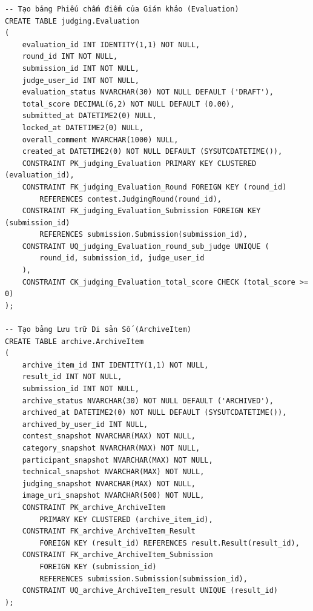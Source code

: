 \begin{verbatim}
-- Tạo bảng Phiếu chấm điểm của Giám khảo (Evaluation)
CREATE TABLE judging.Evaluation
(
    evaluation_id INT IDENTITY(1,1) NOT NULL,
    round_id INT NOT NULL,
    submission_id INT NOT NULL,
    judge_user_id INT NOT NULL,
    evaluation_status NVARCHAR(30) NOT NULL DEFAULT ('DRAFT'),
    total_score DECIMAL(6,2) NOT NULL DEFAULT (0.00),
    submitted_at DATETIME2(0) NULL,
    locked_at DATETIME2(0) NULL,
    overall_comment NVARCHAR(1000) NULL,
    created_at DATETIME2(0) NOT NULL DEFAULT (SYSUTCDATETIME()),
    CONSTRAINT PK_judging_Evaluation PRIMARY KEY CLUSTERED (evaluation_id),
    CONSTRAINT FK_judging_Evaluation_Round FOREIGN KEY (round_id) 
        REFERENCES contest.JudgingRound(round_id),
    CONSTRAINT FK_judging_Evaluation_Submission FOREIGN KEY (submission_id) 
        REFERENCES submission.Submission(submission_id),
    CONSTRAINT UQ_judging_Evaluation_round_sub_judge UNIQUE (
        round_id, submission_id, judge_user_id
    ),
    CONSTRAINT CK_judging_Evaluation_total_score CHECK (total_score >= 0)
);

-- Tạo bảng Lưu trữ Di sản Số (ArchiveItem)
CREATE TABLE archive.ArchiveItem
(
    archive_item_id INT IDENTITY(1,1) NOT NULL,
    result_id INT NOT NULL,
    submission_id INT NOT NULL,
    archive_status NVARCHAR(30) NOT NULL DEFAULT ('ARCHIVED'),
    archived_at DATETIME2(0) NOT NULL DEFAULT (SYSUTCDATETIME()),
    archived_by_user_id INT NULL,
    contest_snapshot NVARCHAR(MAX) NOT NULL,
    category_snapshot NVARCHAR(MAX) NOT NULL,
    participant_snapshot NVARCHAR(MAX) NOT NULL,
    technical_snapshot NVARCHAR(MAX) NOT NULL,
    judging_snapshot NVARCHAR(MAX) NOT NULL,
    image_uri_snapshot NVARCHAR(500) NOT NULL,
    CONSTRAINT PK_archive_ArchiveItem 
        PRIMARY KEY CLUSTERED (archive_item_id),
    CONSTRAINT FK_archive_ArchiveItem_Result 
        FOREIGN KEY (result_id) REFERENCES result.Result(result_id),
    CONSTRAINT FK_archive_ArchiveItem_Submission 
        FOREIGN KEY (submission_id) 
        REFERENCES submission.Submission(submission_id),
    CONSTRAINT UQ_archive_ArchiveItem_result UNIQUE (result_id)
);
\end{verbatim}
